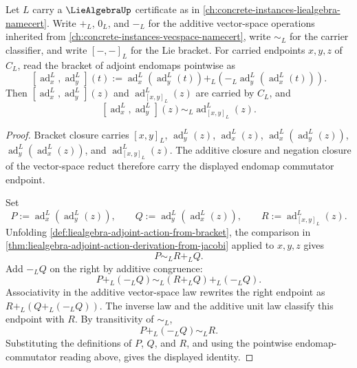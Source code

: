 \begin{theorem}
\label{thm:liealgebra-inner-derivation-commutator-identity}
Let $L$ carry a $\LieAlgebraUp$ certificate as in \autoref{ch:concrete-instances-liealgebra-namecert}. Write $+_{L}$, $0_{L}$, and $-_{L}$ for the additive vector-space operations inherited from \autoref{ch:concrete-instances-vecspace-namecert}, write $\sim_{L}$ for the carrier classifier, and write $[-,-]_L$ for the Lie bracket. For carried endpoints $x,y,z$ of $C_L$, read the bracket of adjoint endomaps pointwise as
$$
[\operatorname{ad}^{L}_{x},\operatorname{ad}^{L}_{y}](t)
:=
\operatorname{ad}^{L}_{x}(\operatorname{ad}^{L}_{y}(t))
+_{L}
(-_{L}\operatorname{ad}^{L}_{y}(\operatorname{ad}^{L}_{x}(t))).
$$
Then $[\operatorname{ad}^{L}_{x},\operatorname{ad}^{L}_{y}](z)$ and $\operatorname{ad}^{L}_{[x,y]_L}(z)$ are carried by $C_L$, and
$$
[\operatorname{ad}^{L}_{x},\operatorname{ad}^{L}_{y}](z)
\sim_{L}
\operatorname{ad}^{L}_{[x,y]_L}(z).
$$
\end{theorem}
\begin{proof}
Bracket closure carries $[x,y]_L$, $\operatorname{ad}^{L}_{y}(z)$, $\operatorname{ad}^{L}_{x}(z)$, $\operatorname{ad}^{L}_{x}(\operatorname{ad}^{L}_{y}(z))$, $\operatorname{ad}^{L}_{y}(\operatorname{ad}^{L}_{x}(z))$, and $\operatorname{ad}^{L}_{[x,y]_L}(z)$. The additive closure and negation closure of the vector-space reduct therefore carry the displayed endomap commutator endpoint.

Set
$$
P:=\operatorname{ad}^{L}_{x}(\operatorname{ad}^{L}_{y}(z)),
\qquad
Q:=\operatorname{ad}^{L}_{y}(\operatorname{ad}^{L}_{x}(z)),
\qquad
R:=\operatorname{ad}^{L}_{[x,y]_L}(z).
$$
Unfolding \autoref{def:liealgebra-adjoint-action-from-bracket}, the comparison in \autoref{thm:liealgebra-adjoint-action-derivation-from-jacobi} applied to $x,y,z$ gives
$$
P\sim_{L}R+_{L}Q.
$$
Add $-_{L}Q$ on the right by additive congruence:
$$
P+_{L}(-_{L}Q)
\sim_{L}
(R+_{L}Q)+_{L}(-_{L}Q).
$$
Associativity in the additive vector-space law rewrites the right endpoint as $R+_{L}(Q+_{L}(-_{L}Q))$. The inverse law and the additive unit law classify this endpoint with $R$. By transitivity of $\sim_{L}$,
$$
P+_{L}(-_{L}Q)\sim_{L}R.
$$
Substituting the definitions of $P$, $Q$, and $R$, and using the pointwise endomap-commutator reading above, gives the displayed identity.
\end{proof}

